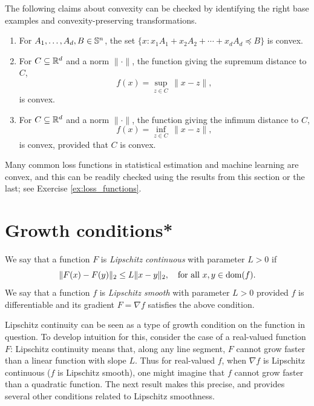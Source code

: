 \medskip

\begin{Example}
The following claims about convexity can be checked by identifying   
the right base examples and convexity-preserving transformations. 

\begin{enumerate}[label=\alph*.]
\item For $A_1,\ldots,A_d,B \in \mathbb{S}^n$, the set $\{x : x_1 A_1 + x_2 A_2 +
  \cdots + x_d A_d \preceq B \}$ is convex.  

\item For $C \subseteq \mathbb{R}^d$ and a norm $\|\cdot\|$, the function giving the
  supremum distance to $C$,
\[
f(x) = \sup_{z \in C} \, \|x - z\|,
\]
is convex.

\item For $C \subseteq \mathbb{R}^d$ and a norm $\|\cdot\|$, the function giving the
  infimum distance to $C$,
\[
f(x) = \inf_{z \in C} \, \|x - z\|,
\]
is convex, provided that $C$ is convex.
\end{enumerate}
\end{Example}

Many common loss functions in statistical estimation and machine learning are
convex, and this can be readily checked using the results from this section or
the last; see Exercise \ref{ex:loss_functions}.             

\section{Growth conditions*}

We say that a function $F$ is \emph{Lipschitz continuous} with parameter $L>0$
if 
\[
\|F(x) - F(y)\|_2 \leq L \|x-y\|_2, \quad \text{for all $x,y \in
  \operatorname{dom}(f)$}. 
\]
We say that a function $f$ is \emph{Lipschitz smooth} with parameter $L>0$
provided $f$ is differentiable and its gradient $F=\nabla f$ satisfies the above
condition. 

Lipschitz continuity can be seen as a type of growth condition on the function
in question. To develop intuition for this, consider the case of a real-valued
function $F$: Lipschitz continuity means that, along any line segment, $F$
cannot grow faster than a linear function with slope $L$. Thus for real-valued $f$,
when $\nabla f$ is Lipschitz continuous ($f$ is Lipschitz smooth), one might
imagine that $f$ cannot grow faster than a quadratic function. The next
result makes this precise, and provides several other conditions related to
Lipschitz smoothness.

